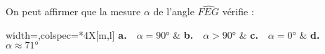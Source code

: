 \begin{enumerate}[resume]
	On peut affirmer que la mesure $\alpha$ de l'angle $\widehat{FEG}$ vérifie :
	
	\medskip
	
	\begin{tblr}{width=\linewidth,colspec={*{4}{X[m,l]}}}
		\textbf{a.}~~$\alpha = \ang{90}$ &
		\textbf{b.}~~$\alpha > \ang{90}$ &
		\textbf{c.}~~$\alpha = \ang{0}$ &
		\textbf{d.}~~$\alpha \approx \ang{71}$
	\end{tblr}
\end{enumerate}
